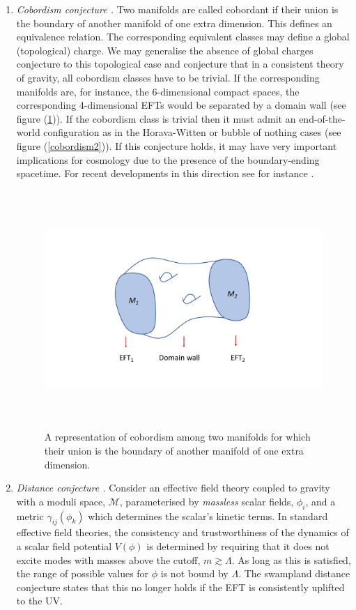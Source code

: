 \begin{enumerate}
\item{\it Cobordism conjecture \cite{McNamara:2019rup}.} Two manifolds are called cobordant if their union is the boundary of another manifold of one extra dimension. This defines an equivalence relation. The corresponding equivalent classes may define a global (topological) charge. We may generalise the absence of global charges conjecture to this topological case and conjecture that  in  a consistent theory of gravity, all cobordism classes have to be trivial. If the corresponding manifolds are, for instance, the 6-dimensional compact spaces, the corresponding 4-dimensional EFTs would be separated by a domain wall (see figure (\ref{cobordism})). If the cobordism class is trivial then it must admit  an end-of-the-world configuration as in the Horava-Witten or bubble of nothing cases (see figure (\ref{cobordism2})). If this conjecture holds, it may have very important implications for cosmology due to the presence of the boundary-ending spacetime. For recent developments in this direction see for instance \cite{Angius:2022aeq,Angius:2022mgh}.

\begin{figure}[t]
\begin{center}
\includegraphics[width=140mm,height=90mm]{Sections/Figures/Cobordism.pdf} 
\vskip -15pt
\caption{A representation of cobordism among two manifolds for which their union is the boundary of another manifold of one extra dimension.} \label{cobordism}
\end{center}
\end{figure}



\item{\it Distance conjecture \cite{Ooguri:2006in}.} 
Consider an effective field theory coupled to gravity with a moduli space, ${\mathcal M}$, parameterised by {\em massless} scalar fields, $\phi_i$, and a metric $\gamma_{ij} (\phi_k)$ which determines the scalar's kinetic terms. 
In standard effective field theories, the consistency and trustworthiness of the dynamics of a scalar field potential $V(\phi)$ is determined by requiring that it does not excite modes with masses above the cutoff, $m \gtrsim \Lambda$.
 As long as this is satisfied, the range of possible values for $\phi$ is not bound by $\Lambda$. The swampland distance conjecture states that this no longer holds if the EFT is consistently uplifted to the UV. 


\end{enumerate}
